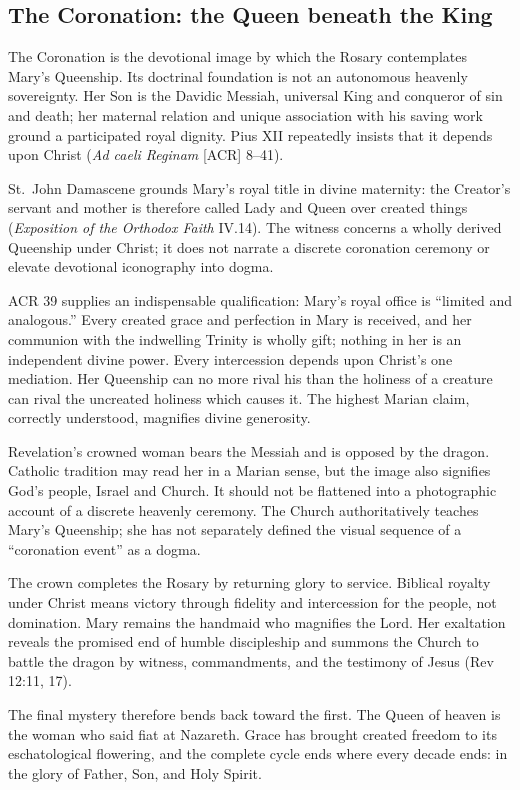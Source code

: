 \subsection{The Coronation: the Queen beneath the King}


The Coronation is the devotional image by which the Rosary contemplates Mary's Queenship. Its doctrinal foundation is not an autonomous heavenly sovereignty. Her Son is the Davidic Messiah, universal King and conqueror of sin and death; her maternal relation and unique association with his saving work ground a participated royal dignity. Pius XII repeatedly insists that it depends upon Christ (\emph{Ad caeli Reginam} [ACR] 8--41).

St.~John Damascene grounds Mary's royal title in divine maternity: the Creator's servant and mother is therefore called Lady and Queen over created things (\emph{Exposition of the Orthodox Faith} IV.14). The witness concerns a wholly derived Queenship under Christ; it does not narrate a discrete coronation ceremony or elevate devotional iconography into dogma.

ACR 39 supplies an indispensable qualification: Mary's royal office is ``limited and analogous.'' Every created grace and perfection in Mary is received, and her communion with the indwelling Trinity is wholly gift; nothing in her is an independent divine power. Every intercession depends upon Christ's one mediation. Her Queenship can no more rival his than the holiness of a creature can rival the uncreated holiness which causes it. The highest Marian claim, correctly understood, magnifies divine generosity.

Revelation's crowned woman bears the Messiah and is opposed by the dragon. Catholic tradition may read her in a Marian sense, but the image also signifies God's people, Israel and Church. It should not be flattened into a photographic account of a discrete heavenly ceremony. The Church authoritatively teaches Mary's Queenship; she has not separately defined the visual sequence of a ``coronation event'' as a dogma.

The crown completes the Rosary by returning glory to service. Biblical royalty under Christ means victory through fidelity and intercession for the people, not domination. Mary remains the handmaid who magnifies the Lord. Her exaltation reveals the promised end of humble discipleship and summons the Church to battle the dragon by witness, commandments, and the testimony of Jesus (Rev 12:11, 17).

The final mystery therefore bends back toward the first. The Queen of heaven is the woman who said fiat at Nazareth. Grace has brought created freedom to its eschatological flowering, and the complete cycle ends where every decade ends: in the glory of Father, Son, and Holy Spirit.
